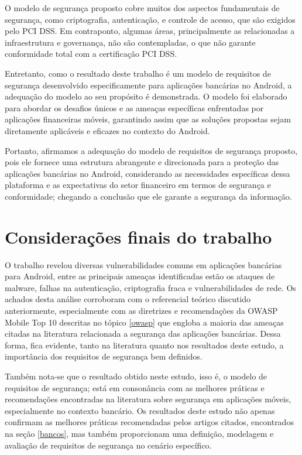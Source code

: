     O modelo de segurança proposto cobre muitos dos aspectos fundamentais de segurança, como criptografia, autenticação, e controle de acesso, que são exigidos pelo PCI DSS. Em contraponto, algumas áreas, principalmente as relacionadas a infraestrutura e governança, não são contempladas, o que não garante conformidade total com a certificação PCI DSS. 

    Entretanto, como o resultado deste trabalho é um modelo de requisitos de segurança desenvolvido especificamente para aplicações bancárias no Android, a adequação do modelo ao seu propósito é demonstrada. O modelo foi elaborado para abordar os desafios únicos e as ameaças específicas enfrentadas por aplicações financeiras móveis, garantindo assim que as soluções propostas sejam diretamente aplicáveis e eficazes no contexto do Android.

    Portanto, afirmamos a adequação do modelo de requisitos de segurança proposto, pois ele fornece uma estrutura abrangente e direcionada para a proteção das aplicações bancárias no Android, considerando as necessidades específicas dessa plataforma e as expectativas do setor financeiro em termos de segurança e conformidade; chegando a conclusão que ele garante a segurança da informação.

    \section{Considerações finais do trabalho}
    O trabalho revelou diversas vulnerabilidades comuns em aplicações bancárias para Android, entre as principais ameaças identificadas estão os ataques de malware, falhas na autenticação, criptografia fraca e vulnerabilidades de rede. Os achados desta análise corroboram com o referencial teórico discutido anteriormente, especialmente com as diretrizes e recomendações da OWASP Mobile Top 10 descritas no tópico \ref{owasp} que engloba a maioria das ameaças citadas na literatura relacionada a segurança das aplicações bancárias. Dessa forma, fica evidente, tanto na literatura quanto nos resultados deste estudo, a importância dos requisitos de segurança bem definidos.

    Também nota-se que o resultado obtido neste estudo, isso é, o modelo de requisitos de segurança; está em consonância com as melhores práticas e recomendações encontradas na literatura sobre segurança em aplicações móveis, especialmente no contexto bancário. Os resultados deste estudo não apenas confirmam as melhores práticas recomendadas pelos artigos citados, encontrados na seção \ref{bancos}, mas também proporcionam uma definição, modelagem e avaliação de requisitos de segurança no cenário específico. 

